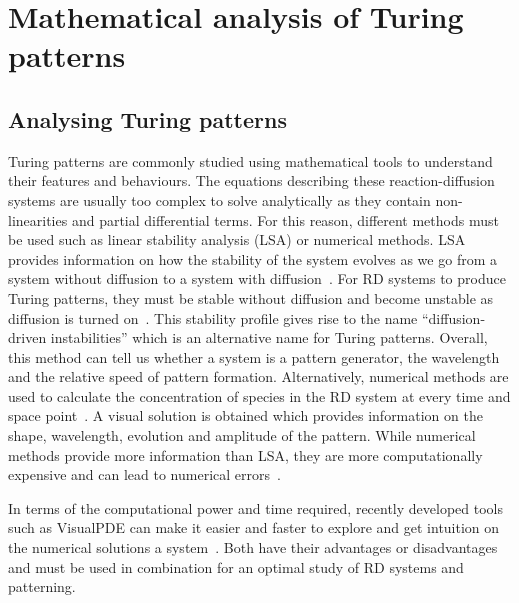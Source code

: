 

%
\section{Mathematical analysis of Turing patterns}

\subsection{Analysing Turing patterns}
Turing patterns are commonly studied using mathematical tools to understand their features and behaviours.
The equations describing these reaction-diffusion systems are usually too complex to solve analytically as they contain non-linearities and partial differential terms.
For this reason, different methods must be used such as linear stability analysis (LSA) or numerical methods.
LSA provides information on how the stability of the system evolves as we go from a system without diffusion to a system with diffusion~\parencite{Glendinning1994}.
For RD systems to produce Turing patterns, they must be stable without diffusion and become unstable as diffusion is turned on~\parencite{J.DMurray2002}.
This stability profile gives rise to the name “diffusion-driven instabilities” which is an alternative name for Turing patterns.
Overall, this method can tell us whether a system is a pattern generator, the wavelength and the relative speed of pattern formation.
Alternatively, numerical methods are used to calculate the concentration of species in the RD system at every time and space point~\parencite{Ramos1983}.
A visual solution is obtained which provides information on the shape, wavelength, evolution and amplitude of the pattern.
While numerical methods provide more information than LSA, they are more computationally expensive and can lead to numerical errors~\parencite{J.DMurray2002}.

In terms of the computational power and time required, recently developed tools such as VisualPDE can make it easier and faster to explore and get intuition on the numerical solutions a system~\parencite{Walker2023}.
Both have their advantages or disadvantages and must be used in combination for an optimal study of RD systems and patterning.
